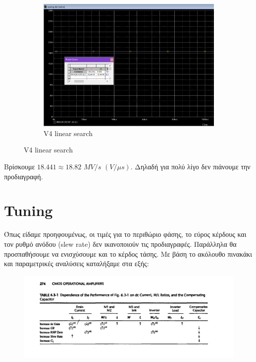 \documentclass[12pt, a4paper]{article}
\begin{document}
\begin{figure}[h!]
\begin{subfigure}[b]{0.5\textwidth}
         \includegraphics[height=.4\textheight, width=\textwidth, keepaspectratio]{assets/slew_rate.png}
         \caption{V4 linear search} 
     \end{subfigure}
\end{figure}

Βρίσκουμε $18.441  \approx 18.82$ $MV/s$ $(V/\mu s)$. Δηλαδή για πολύ λίγο δεν πιάνουμε την προδιαγραφή.

\section{Tuning}

Όπως είδαμε προηφουμένως, οι τιμές για το περιθώριο φάσης, το εύρος κέρδους και τον ρυθμό ανόδου (slew rate) δεν ικανοποιούν τις προδιαγραφές. Παράλληλα θα προσπαθήσουμε να ενισχύσουμε και το κέρδος τάσης. Με βάση το ακόλουθο πινακάκι και παραμετρικές αναλύσεις καταλήξαμε στα εξής:

\begin{figure}[h!]
	\centering
	\includegraphics[width = \textwidth, height = .2\textheight, keepaspectratio]{assets/tuning_table.png}
\end{figure}
\end{document}
